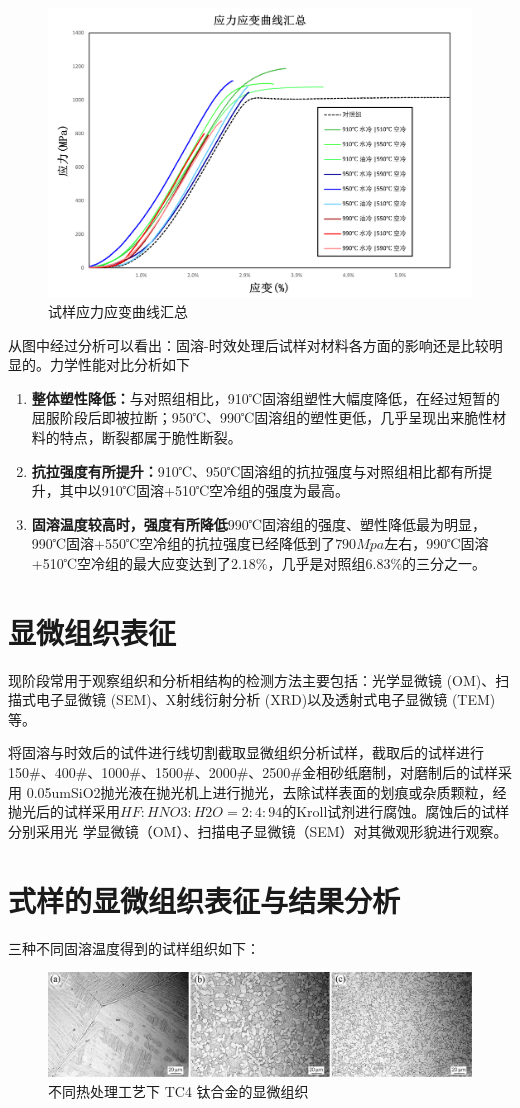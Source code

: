 \begin{figure}[h!]
	\centering
	\includegraphics[width=0.99\linewidth]{pic/试样应力应变曲线汇总.png}
	\caption{试样应力应变曲线汇总}
	\label{fig:试样应力应变曲线汇总}
\end{figure}

从图中经过分析可以看出：固溶-时效处理后试样对材料各方面的影响还是比较明显的。力学性能对比分析如下
\begin{enumerate}
	\item \textbf{整体塑性降低：}与对照组相比，910℃固溶组塑性大幅度降低，在经过短暂的屈服阶段后即被拉断；950℃、990℃固溶组的塑性更低，几乎呈现出来脆性材料的特点，断裂都属于脆性断裂。
	\item \textbf{抗拉强度有所提升：}910℃、950℃固溶组的抗拉强度与对照组相比都有所提升，其中以910℃固溶+510℃空冷组的强度为最高。
	\item \textbf{固溶温度较高时，强度有所降低}990℃固溶组的强度、塑性降低最为明显，990℃固溶+550℃空冷组的抗拉强度已经降低到了$ 790Mpa $左右，990℃固溶+510℃空冷组的最大应变达到了$ 2.18\% $，几乎是对照组$ 6.83\% $的三分之一。
\end{enumerate}


\section{显微组织表征}
现阶段常用于观察组织和分析相结构的检测方法主要包括：光学显微镜 (OM)、扫描式电子显微镜 (SEM)、X射线衍射分析 (XRD)以及透射式电子显微镜 (TEM)等。

将固溶与时效后的试件进行线切割截取显微组织分析试样，截取后的试样进行 150\#、400\#、1000\#、1500\#、2000\#、2500\#金相砂纸磨制，对磨制后的试样采用 0.05umSiO2抛光液在抛光机上进行抛光，去除试样表面的划痕或杂质颗粒，经抛光后的试样采用$ HF:HNO3:H2O=2:4:94 $的Kroll试剂进行腐蚀。腐蚀后的试样分别采用光 学显微镜（OM）、扫描电子显微镜（SEM）对其微观形貌进行观察。

\section{式样的显微组织表征与结果分析}
三种不同固溶温度得到的试样组织如下：
\begin{figure}[h!]
	\centering
	\includegraphics[width=0.7\linewidth]{pic/demo-mico}
	\caption{不同热处理工艺下 TC4 钛合金的显微组织}
	\label{fig:demo-mico}
\end{figure}